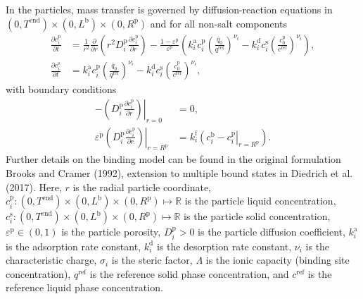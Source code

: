 \documentclass{article}
\begin{document}
In the particles, mass transfer is governed by diffusion-reaction equations in $(0, T^{\mathrm{end}}) \times (0, L^{\mathrm{b}})\times (0, R^{\mathrm{p}})$ and for all non-salt components
\begin{align}
    \frac{\partial c^{\mathrm{p}}_{i}}{\partial t}
    &= \frac{1}{r^{2}} \frac{\partial }{\partial r} \left( r^{2} D^{\mathrm{p}}_{i} \frac{\partial c^{\mathrm{p}}_{i}}{\partial r} \right)
        - \frac{1 - \varepsilon^{\mathrm{p}}}{\varepsilon^{\mathrm{p}}}\left(k^{\mathrm{a}}_{i} c^{\mathrm{p}}_{i} \left( \frac{\bar{q}_{0}}{q^{\mathrm{ref}}} \right)^{\nu_{i}} - k^{\mathrm{d}}_{i} c^{\mathrm{s}}_{i} \left( \frac{c^{\mathrm{p}}_{0}}{c^{\mathrm{ref}}} \right)^{\nu_{i}} \right),
    \\
    \frac{\partial c^{\mathrm{s}}_{i}}{\partial t}
    &= k^{\mathrm{a}}_{i} c^{\mathrm{p}}_{i} \left( \frac{\bar{q}_{0}}{q^{\mathrm{ref}}} \right)^{\nu_{i}}
        - k^{\mathrm{d}}_{i} c^{\mathrm{s}}_{i} \left( \frac{c^{\mathrm{p}}_{0}}{c^{\mathrm{ref}}} \right)^{\nu_{i}},
\end{align}
with boundary conditions
\begin{align}
    - \left. \left( D^{\mathrm{p}}_{i} \frac{\partial c^{\mathrm{p}}_{i}}{\partial r} \right) \right|_{r=0}
    &= 0,
    \\
    \varepsilon^{\mathrm{p}} \left. \left( D^{\mathrm{p}}_{i} \frac{\partial c^{\mathrm{p}}_{i}}{\partial r} \right)\right|_{r = R^{\mathrm{p}}}
    &= k^{\mathrm{f}}_{i} \left. \left( c^{\mathrm{b}}_{i} - c^{\mathrm{p}}_{i} \right|_{r = R^{\mathrm{p}}} \right).
\end{align}
Further details on the binding model can be found in the original formulation Brooks and Cramer (1992), extension to multiple bound states in Diedrich et al. (2017).
Here, $r$ is the radial particle coordinate, $c^{\mathrm{p}}_{i}\colon (0, T^{\mathrm{end}}) \times (0, L^{\mathrm{b}})\times (0, R^{\mathrm{p}}) \mapsto \mathbb{R}$ is the particle liquid concentration, $c^{\mathrm{s}}_{i}\colon (0, T^{\mathrm{end}}) \times (0, L^{\mathrm{b}})\times (0, R^{\mathrm{p}}) \mapsto \mathbb{R}$ is the particle solid concentration, $\varepsilon^{\mathrm{p}}\in (0, 1)$ is the particle porosity, $D^{\mathrm{p}}_{i}> 0$ is the particle diffusion coefficient, $k^{\mathrm{a}}_{i}$ is the adsorption rate constant, $k^{\mathrm{d}}_{i}$ is the desorption rate constant, $\nu_{i}$ is the characteristic charge, $\sigma_{i}$ is the steric factor, $\Lambda$ is the ionic capacity (binding site concentration), $q^{\mathrm{ref}}$ is the reference solid phase concentration, and $c^{\mathrm{ref}}$ is the reference liquid phase concentration.
\end{document}
